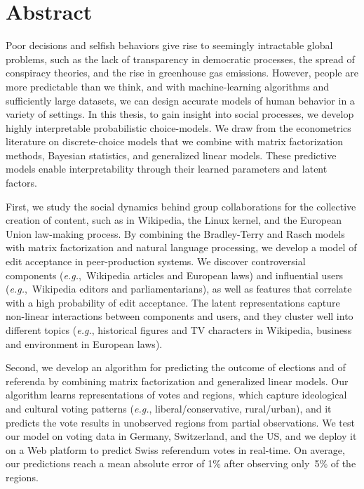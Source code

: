 \cleardoublepage
\chapter*{Abstract}

Poor decisions and selfish behaviors give rise to seemingly intractable global problems, such as the lack of transparency in democratic processes, the spread of conspiracy theories, and the rise in greenhouse gas emissions.
However, people are more predictable than we think, and with machine-learning algorithms and sufficiently large datasets, we can design accurate models of human behavior in a variety of settings.
In this thesis, to gain insight into social processes, we develop highly interpretable probabilistic choice-models.
We draw from the econometrics literature on discrete-choice models that we combine with matrix factorization methods, Bayesian statistics, and generalized linear models.
These predictive models enable interpretability through their learned parameters and latent factors.

First, we study the social dynamics behind group collaborations for the collective creation of content, such as in Wikipedia, the Linux kernel, and the European Union law-making process.
By combining the Bradley-Terry and Rasch models with matrix factorization and natural language processing, we develop a model of edit acceptance in peer-production systems.
We discover controversial components (\textit{e.g.},~Wikipedia articles and European laws) and influential users (\textit{e.g.},~Wikipedia editors and parliamentarians), as well as features that correlate with a high probability of edit acceptance.
The latent representations capture non-linear interactions between components and users, and they cluster well into different topics (\textit{e.g.}, historical figures and TV characters in Wikipedia, business and environment in European laws).

Second, we develop an algorithm for predicting the outcome of elections and of referenda by combining matrix factorization and generalized linear models.
Our algorithm learns representations of votes and regions, which capture ideological and cultural voting patterns (\textit{e.g.}, liberal/conservative, rural/urban), and it predicts the vote results in unobserved regions from partial observations.
We test our model on voting data in Germany, Switzerland, and the US, and we deploy it on a Web platform to predict Swiss referendum votes in real-time.
On average, our predictions reach a mean absolute error of 1\% after observing only~5\% of the regions.

